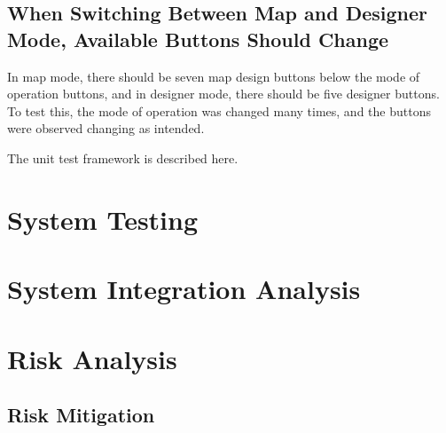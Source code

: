 \subsection{When Switching Between Map and Designer Mode, Available Buttons Should Change}
In map mode, there should be seven map design buttons below the mode of operation buttons, and in designer mode, there should be five designer buttons. To test this, the mode of operation was changed many times, and the buttons were observed changing as intended.

The unit test framework is described here.   

\section{System Testing}

\section{System Integration Analysis}

\section{Risk Analysis}

\subsection{Risk Mitigation}


